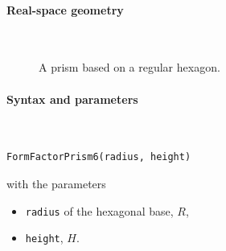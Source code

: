 \paragraph{Real-space geometry}\strut\\

\begin{figure}[H]
\hfill
{}
\hfill
{}
\hfill
{}
\hfill
\caption{A prism based on a regular hexagon.}
\end{figure}

\FloatBarrier

\paragraph{Syntax and parameters}\strut\\[-2ex plus .2ex minus .2ex]
\begin{lstlisting}[language=python, style=eclipseboxed,numbers=none,nolol]
  FormFactorPrism6(radius, height)
\end{lstlisting}
with the parameters
\begin{itemize}
\item \texttt{radius} of the hexagonal base, $R$,
\item \texttt{height}, $H$.
\end{itemize}


